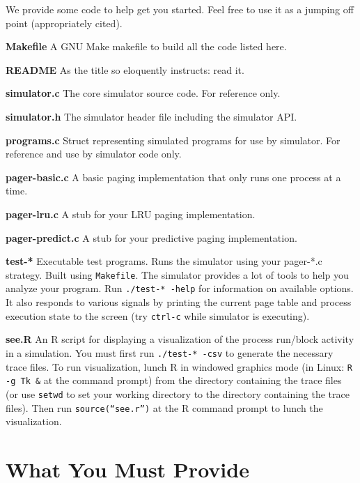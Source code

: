 \documentclass[12pt]{article}
\newenvironment{packed_enum}{
\begin{enumerate}
  \setlength{\itemsep}{1pt}
  \setlength{\parskip}{0pt}
  \setlength{\parsep}{0pt}
}{\end{enumerate}}
\begin{document}
We provide some code to help get you started. Feel free to use it as a
jumping off point (appropriately cited).

\begin{packed_enum}
\item {\bf Makefile} A GNU Make makefile to build all the code listed
  here.
\item {\bf README} As the title so eloquently instructs: read it.
\item {\bf simulator.c} The core simulator source code. For reference
  only.
\item {\bf simulator.h} The simulator header file including the simulator
  API.
\item {\bf programs.c} Struct representing simulated programs for use
  by simulator. For reference and use by simulator code only.
\item {\bf pager-basic.c} A basic paging implementation that only runs
  one process at a time.
\item {\bf pager-lru.c} A stub for your LRU paging implementation.
\item {\bf pager-predict.c} A stub for your predictive paging implementation.
\item {\bf test-*} Executable test programs. Runs the simulator using
  your pager-*.c strategy. Built using \texttt{Makefile}. The simulator
  provides a lot of tools to help you analyze your program.
  Run \texttt{./test-* -help} for information on available options. It
  also responds to various signals by printing the current page table
  and process execution state to the screen (try \texttt{ctrl-c} while
  simulator is executing).
\item {\bf see.R} An R script for displaying a visualization of the
  process run/block activity in a simulation.
  You must first run \texttt{./test-* -csv} to
  generate the necessary trace files. To run visualization, lunch R in
  windowed graphics mode (in Linux: \texttt{R -g Tk \&} at the command
  prompt) from the directory containing the trace
  files (or use \texttt{setwd} to set your working directory to the directory
  containing the trace files). Then run \texttt{source(``see.r'')} at the R
  command prompt to lunch the visualization.
\end{packed_enum}

\section{What You Must Provide}
\end{document}
